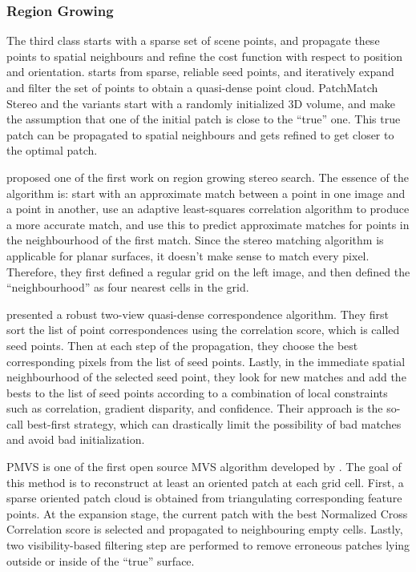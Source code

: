 \subsubsection{Region Growing}

The third class starts with a sparse set of scene points, and propagate these points to spatial neighbours and refine the cost function with respect to position and orientation. \citeauthor{furukawa2010accurate} starts from sparse, reliable seed points, and iteratively expand and filter the set of points to obtain a quasi-dense point cloud. PatchMatch Stereo and the variants start with a randomly initialized 3D volume, and make the assumption that one of the initial patch is close to the ``true'' one. This true patch can be propagated to spatial neighbours and gets refined to get closer to the optimal patch.

\citeauthor{otto1989region} proposed one of the first work on region growing stereo search. The essence of the algorithm is: start with an approximate match between a point in one image and a point in another, use an adaptive least-squares correlation algorithm to produce a more accurate match, and use this to predict approximate matches for points in the neighbourhood of the first match. Since the stereo matching algorithm is applicable for planar surfaces, it doesn't make sense to match every pixel. Therefore, they first defined a regular grid on the left image, and then defined the ``neighbourhood'' as four nearest cells in the grid.

\citeauthor{lhuillier2005quasi} presented a robust two-view quasi-dense correspondence algorithm. They first sort the list of point correspondences using the correlation score, which is called seed points. Then at each step of the propagation, they choose the best corresponding pixels from the list of seed points. Lastly, in the immediate spatial neighbourhood of the selected seed point, they look for new matches and add the bests to the list of seed points according to a combination of local constraints such as correlation, gradient disparity, and confidence. Their approach is the so-call best-first strategy, which can drastically limit the possibility of bad matches and avoid bad initialization.

PMVS is one of the first open source MVS algorithm developed by \citeauthor{furukawa2010accurate}. The goal of this method is to reconstruct at least an oriented patch at each grid cell. First, a sparse oriented patch cloud is obtained from triangulating corresponding feature points. At the expansion stage, the current patch with the best Normalized Cross Correlation score is selected and propagated to neighbouring empty cells. Lastly, two visibility-based filtering step are performed to remove erroneous patches lying outside or inside of the ``true'' surface.

